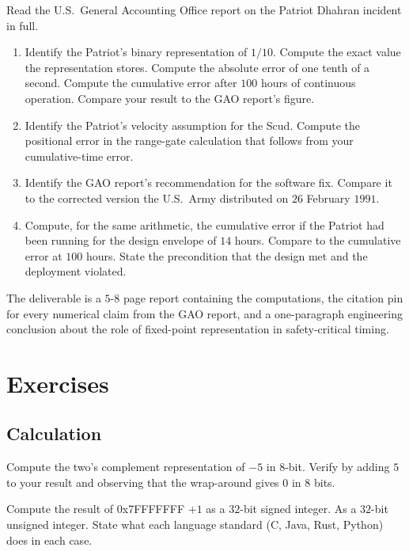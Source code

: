 \begin{project}
Read the U.S.\ General Accounting Office report on the Patriot Dhahran incident \cite{acc:gao-patriot-1992} in full.

\begin{enumerate}[leftmargin=*]
  \item Identify the Patriot's binary representation of $1/10$. Compute the exact value the representation stores. Compute the absolute error of one tenth of a second. Compute the cumulative error after $100$ hours of continuous operation. Compare your result to the GAO report's figure.
  \item Identify the Patriot's velocity assumption for the Scud. Compute the positional error in the range-gate calculation that follows from your cumulative-time error.
  \item Identify the GAO report's recommendation for the software fix. Compare it to the corrected version the U.S.\ Army distributed on $26$ February $1991$.
  \item Compute, for the same arithmetic, the cumulative error if the Patriot had been running for the design envelope of $14$ hours. Compare to the cumulative error at $100$ hours. State the precondition that the design met and the deployment violated.
\end{enumerate}

The deliverable is a $5$-$8$ page report containing the computations, the citation pin for every numerical claim from the GAO report, and a one-paragraph engineering conclusion about the role of fixed-point representation in safety-critical timing.
\end{project}

\section{Exercises}

\subsection*{Calculation}

\begin{exercise}
Compute the two's complement representation of $-5$ in $8$-bit. Verify by adding $5$ to your result and observing that the wrap-around gives $0$ in $8$ bits.
\end{exercise}

\begin{exercise}
Compute the result of $0$x7FFFFFFF $+ 1$ as a $32$-bit signed integer. As a $32$-bit unsigned integer. State what each language standard (C, Java, Rust, Python) does in each case.
\end{exercise}

